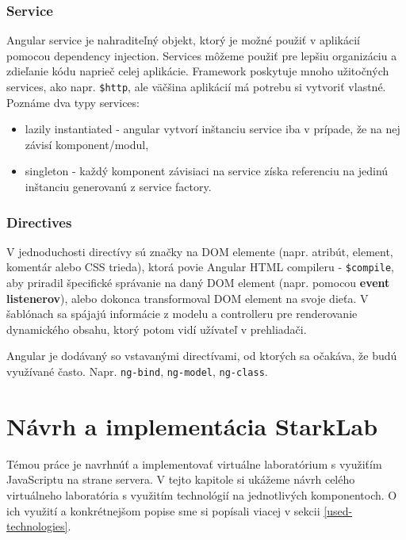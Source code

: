 \subsubsection{Service}
Angular service je nahraditeľný objekt, ktorý je možné použiť v aplikácií pomocou dependency injection. Services môžeme použiť pre lepšiu organizáciu a zdieľanie kódu naprieč celej aplikácie. Framework poskytuje mnoho užitočných services, ako napr. \verb|$http|, ale väčšina aplikácií má potrebu si vytvoriť vlastné.\cite{angular-docs}
Poznáme dva typy services:
\begin{itemize}
\item lazily instantiated - angular vytvorí inštanciu service iba v prípade, že na nej závisí komponent/modul,
\item singleton - každý komponent závisiaci na service získa referenciu na jedinú inštanciu generovanú z service factory.
\end{itemize}

\subsubsection{Directives}
V jednoduchosti directívy sú značky na DOM elemente (napr. atribút, element, komentár alebo CSS trieda), ktorá povie Angular HTML compileru - \verb|$compile|, aby priradil špecifické správanie na daný DOM element (napr. pomocou \textbf{event listenerov}), alebo dokonca transformoval DOM element na svoje dieťa. V šablónach sa spájajú informácie z modelu a controlleru pre renderovanie dynamického obsahu, ktorý potom vidí užívateľ v prehliadači.

Angular je dodávaný so vstavanými directívami, od ktorých sa očakáva, že budú využívané často. Napr. \verb|ng-bind|, \verb|ng-model|, \verb|ng-class|.\cite{angular-docs}


\section{Návrh a implementácia StarkLab}
\indent Témou práce je navrhnúť a implementovať virtuálne laboratórium s využiťím JavaScriptu na strane servera. V tejto kapitole si ukážeme návrh celého virtuálneho laboratória s využitím technológií na jednotlivých komponentoch. O ich využití a konkrétnejšom popise sme si popísali viacej v sekcii \ref{used-technologies}.

